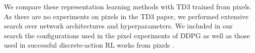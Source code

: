 


We compare these representation learning methods with TD3 trained from pixels.
As there are no experiments on pixels in the TD3 paper, we performed extensive search over network architectures and hyperparameters.
We included in our search the configurations used in the pixel experiments of DDPG \citep{lillicrap2015continuous} as well as those used in successful discrete-action RL works from pixels \citep{schulman2017proximal,pytorchrl,espeholt2018impala}.






